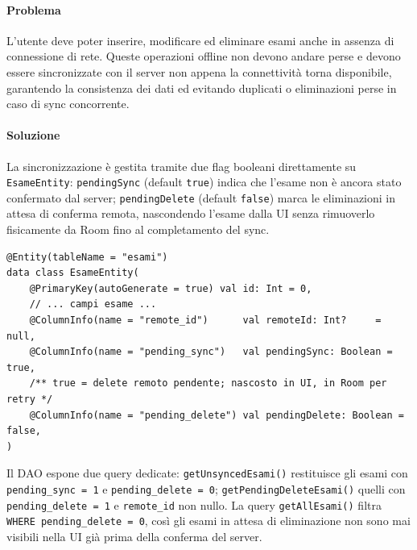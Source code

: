 \documentclass[a4paper,12pt]{report}
\begin{document}
    \paragraph{Problema}
    L'utente deve poter inserire, modificare ed eliminare esami anche in assenza di connessione
    di rete. Queste operazioni offline non devono andare perse e devono essere sincronizzate
    con il server non appena la connettività torna disponibile, garantendo la consistenza dei
    dati ed evitando duplicati o eliminazioni perse in caso di sync concorrente.

    \paragraph{Soluzione}
    La sincronizzazione è gestita tramite due flag booleani direttamente su \texttt{EsameEntity}:
    \texttt{pendingSync} (default \texttt{true}) indica che l'esame non è ancora stato
    confermato dal server; \texttt{pendingDelete} (default \texttt{false}) marca le
    eliminazioni in attesa di conferma remota, nascondendo l'esame dalla UI senza
    rimuoverlo fisicamente da Room fino al completamento del sync.

    \begin{lstlisting}
@Entity(tableName = "esami")
data class EsameEntity(
    @PrimaryKey(autoGenerate = true) val id: Int = 0,
    // ... campi esame ...
    @ColumnInfo(name = "remote_id")      val remoteId: Int?     = null,
    @ColumnInfo(name = "pending_sync")   val pendingSync: Boolean = true,
    /** true = delete remoto pendente; nascosto in UI, in Room per retry */
    @ColumnInfo(name = "pending_delete") val pendingDelete: Boolean = false,
)
    \end{lstlisting}

    Il DAO espone due query dedicate:
    \texttt{getUnsyncedEsami()} restituisce gli esami con \texttt{pending\_sync = 1}
    e \texttt{pending\_delete = 0};
    \texttt{getPendingDeleteEsami()} quelli con \texttt{pending\_delete = 1} e
    \texttt{remote\_id} non nullo.
    La query \texttt{getAllEsami()} filtra \texttt{WHERE pending\_delete = 0}, così gli
    esami in attesa di eliminazione non sono mai visibili nella UI già prima della
    conferma del server.
\end{document}
